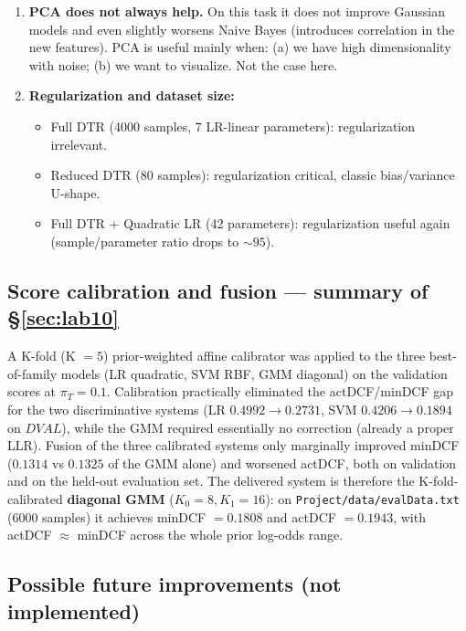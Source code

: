 \documentclass[11pt,a4paper]{article}
\begin{document}
\begin{enumerate}
\item \textbf{PCA does not always help.} On this task it does not
      improve Gaussian models and even slightly worsens Naive Bayes
      (introduces correlation in the new features). PCA is useful
      mainly when: (a) we have high dimensionality with noise;
      (b) we want to visualize. Not the case here.

\item \textbf{Regularization and dataset size:}
      \begin{itemize}
      \item Full DTR (4000 samples, 7 LR-linear parameters):
            regularization irrelevant.
      \item Reduced DTR (80 samples): regularization critical,
            classic bias/variance U-shape.
      \item Full DTR + Quadratic LR (42 parameters): regularization
            useful again (sample/parameter ratio drops to $\sim 95$).
      \end{itemize}
\end{enumerate}

\subsection{Score calibration and fusion --- summary of \S\ref{sec:lab10}}

A K-fold (K $=5$) prior-weighted affine calibrator was applied to
the three best-of-family models (LR quadratic, SVM RBF, GMM
diagonal) on the validation scores at $\pi_T = 0.1$. Calibration
practically eliminated the actDCF/minDCF gap for the two
discriminative systems (LR $0.4992 \to 0.2731$, SVM
$0.4206 \to 0.1894$ on $\mathit{DVAL}$), while the GMM required
essentially no correction (already a proper LLR). Fusion of the
three calibrated systems only marginally improved minDCF
($0.1314$ vs $0.1325$ of the GMM alone) and worsened actDCF, both
on validation and on the held-out evaluation set. The delivered
system is therefore the K-fold-calibrated \textbf{diagonal GMM}
($K_0=8, K_1=16$): on \texttt{Project/data/evalData.txt} (6000
samples) it achieves minDCF $=0.1808$ and actDCF $=0.1943$, with
actDCF $\approx$ minDCF across the whole prior log-odds range.

\subsection{Possible future improvements (not implemented)}
\end{document}

